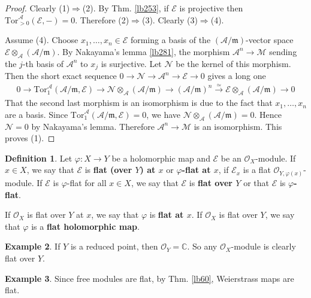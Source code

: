 \documentclass[12pt,b5paper,notitlepage]{report}
\theoremstyle{definition}
\newtheorem{df}{Definition}[section]
\newtheorem{eg}[df]{Example}
\theoremstyle{plain}
\newcommand{\mc}{\mathcal}
\newcommand{\scr}{\mathscr}
\newcommand{\Cbb}{\mathbb C}
\newcommand{\Tor}{\mathrm{Tor}}
\newcommand{\mk}{\mathfrak m}
\numberwithin{equation}{section}
\begin{document}
\begin{proof}
Clearly (1)$\Rightarrow$(2). By Thm. \ref{lb253}, if $\mc E$ is projective then $\Tor_{>0}^{\mc A}(\mc E,-)=0$. Therefore   (2)$\Rightarrow$(3). Clearly (3)$\Rightarrow$(4).

Assume (4). Choose $x_1,\dots,x_n\in\mc E$ forming a basis of the $(\mc A/\mk)$-vector space $\mc E\otimes_{\mc A}(\mc A/\mk)$. By Nakayama's lemma \ref{lb281}, the morphism $\mc A^n\rightarrow\mc M$ sending the $j$-th basis of $\mc A^n$ to $x_j$ is surjective. Let $\mc N$ be the kernel of this morphism. Then the short exact sequence $0\rightarrow\mc N\rightarrow\mc A^n\rightarrow\mc E\rightarrow0$ gives a long one
\begin{align*}
0\rightarrow\Tor_1^{\mc A}(\mc A/\mk,\mc E)\rightarrow\mc N\otimes_{\mc A}(\mc A/\mk)\rightarrow (\mc A/\mk)^n\xrightarrow{\simeq}\mc E\otimes_{\mc A}(\mc A/\mk)\rightarrow0
\end{align*}
That the second last morphism is an isomorphism is due to the fact that $x_1,\dots,x_n$ are a basis. Since  $\Tor_1^{\mc A}(\mc A/\mk,\mc E)=0$, we have $\mc N\otimes_{\mc A}(\mc A/\mk)=0$. Hence $\mc N=0$ by Nakayama's lemma. Therefore $\mc A^n\rightarrow\mc M$ is an isomorphism. This proves (1).
\end{proof}





\begin{df}
Let $\varphi:X\rightarrow Y$ be a holomorphic map and $\scr E$ be an $\scr O_X$-module. If $x\in X$, we say that $\scr E$ is \textbf{flat (over $Y$) at $x$} or \textbf{$\varphi$-flat at $x$},  if $\scr E_x$ is a flat $\scr O_{Y,\varphi(x)}$-module. If $\scr E$ is $\varphi$-flat for all $x\in X$, we say that $\scr E$ is \textbf{flat over $Y$} or that $\scr E$ is \textbf{$\varphi$-flat}.

If $\scr O_X$ is flat over $Y$ at $x$, we say that $\varphi$ is \textbf{flat at $x$}. If $\scr O_X$ is flat over $Y$, we say that $\varphi$ is a \textbf{flat holomorphic map}.    \hfill  \qedsymbol
\end{df}


\begin{eg}
If $Y$ is a reduced point, then $\scr O_{Y}=\Cbb$. So any $\scr O_X$-module is clearly flat over $Y$.
\end{eg}


\begin{eg}
Since free modules are flat, by Thm. \ref{lb60}, Weierstrass maps are flat.
\end{eg}
\end{document}
